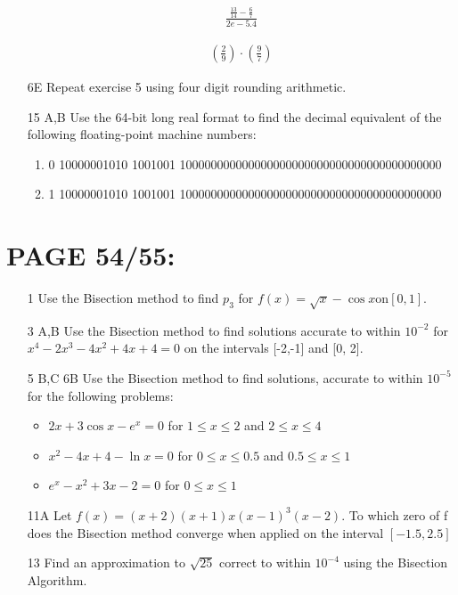 \documentclass[]{article}
\begin{document}
\begin{enumerate}
	\begin{align*}
		\frac{\frac{13}{14} - \frac{6}{7}}{2e - 5.4}
	\end{align*}
	
	\begin{align*}
		(\frac{2}{9})\cdot(\frac{9}{7})
	\end{align*}

	\item[6E] Repeat exercise 5 using four digit rounding arithmetic.
	
	\item[15 A,B] Use the 64-bit long real format to find the decimal equivalent of the following floating-point machine numbers:
	
	\begin{enumerate}
		\item 0 10000001010 1001001 100000000000000000000000000000000000000000
		\item 1 10000001010 1001001 100000000000000000000000000000000000000000
	\end{enumerate}
\end{enumerate}

\section*{PAGE 54/55:} 

\begin{enumerate}
	\item[1] Use the Bisection method to find $ p_3 $ for $ f(x) = \sqrt{x} - \cos x \text{on} [0,1]$.
	\item[3 A,B] Use the Bisection method to find solutions accurate to within $ 10^{-2} $ for $ x^4 - 2x^3 - 4x^2 + 4x +4 = 0 $ on the intervals [-2,-1] and [0, 2].
	\item[5 B,C 6B] Use the Bisection method to find solutions, accurate to within $ 10^{-5} $ for the following problems:
	\begin{itemize}
		\item $ 2x + 3\cos x - e^x = 0 $ for $ 1 \le x \le 2 $ and $ 2 \le x \le 4 $
		\item $ x^2 - 4x + 4 - \ln x = 0 $ for $ 0 \le x \le 0.5 $ and $ 0.5 \le x \le 1 $
		\item $ e^x - x^2 +3x - 2 = 0 $ for $ 0 \le x \le 1 $
	\end{itemize}
	
	\item[11A] Let $ f(x) = (x+2)(x+1)x(x-1)^3(x-2). $ To which zero of f does the Bisection method converge when applied on the interval $ [-1.5, 2.5] $
	\item[13] Find an approximation to $ \sqrt{25} $ correct to within $ 10^{-4} $ using the Bisection Algorithm. 
\end{enumerate}
\end{document}

